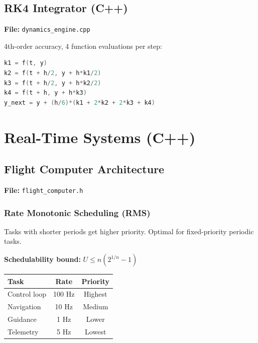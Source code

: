 \documentclass[11pt,a4paper]{article}
\begin{document}
\subsection{RK4 Integrator (C++)}

\textbf{File:} \texttt{dynamics\_engine.cpp}

4th-order accuracy, 4 function evaluations per step:

\begin{lstlisting}[language=C++]
k1 = f(t, y)
k2 = f(t + h/2, y + h*k1/2)
k3 = f(t + h/2, y + h*k2/2)
k4 = f(t + h, y + h*k3)
y_next = y + (h/6)*(k1 + 2*k2 + 2*k3 + k4)
\end{lstlisting}

\section{Real-Time Systems (C++)}

\subsection{Flight Computer Architecture}

\textbf{File:} \texttt{flight\_computer.h}

\subsubsection{Rate Monotonic Scheduling (RMS)}

Tasks with shorter periods get higher priority. Optimal for fixed-priority periodic tasks.

\textbf{Schedulability bound:} $U \leq n(2^{1/n} - 1)$

\begin{table}[h]
\centering
\begin{tabular}{lcc}
\toprule
\textbf{Task} & \textbf{Rate} & \textbf{Priority} \\
\midrule
Control loop & 100 Hz & Highest \\
Navigation & 10 Hz & Medium \\
Guidance & 1 Hz & Lower \\
Telemetry & 5 Hz & Lowest \\
\bottomrule
\end{tabular}
\end{table}
\end{document}
